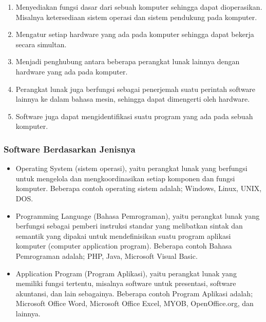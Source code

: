 \begin{enumerate}
\item Menyediakan fungsi dasar dari sebuah komputer sehingga dapat dioperasikan. Misalnya ketersediaan sistem operasi dan sistem pendukung pada komputer.

\item Mengatur setiap hardware yang ada pada komputer sehingga dapat bekerja secara simultan.

\item Menjadi penghubung antara beberapa perangkat lunak lainnya dengan hardware yang ada pada komputer.

\item Perangkat lunak juga berfungsi sebagai penerjemah suatu perintah software lainnya ke dalam bahasa mesin, sehingga dapat dimengerti oleh hardware.

\item Software juga dapat mengidentifikasi suatu program yang ada pada sebuah komputer.
\end{enumerate}

\subsubsection{Software Berdasarkan Jenisnya}

\begin{itemize}

\item Operating System (sistem operasi), yaitu perangkat lunak yang berfungsi untuk mengelola dan mengkoordinasikan setiap komponen dan fungsi komputer. Beberapa contoh operating sistem adalah; Windows, Linux, UNIX, DOS.

\item Programming Language (Bahasa Pemrograman), yaitu perangkat lunak yang berfungsi sebagai pemberi instruksi standar yang melibatkan sintak dan semantik yang dipakai untuk mendefinisikan suatu program aplikasi komputer (computer application program). Beberapa contoh Bahasa Pemrograman adalah; PHP, Java, Microsoft Visual Basic.

\item Application Program (Program Aplikasi), yaitu perangkat lunak yang memiliki fungsi tertentu, misalnya software untuk presentasi, software akuntansi, dan lain sebagainya. Beberapa contoh Program Aplikasi adalah; Microsoft Office Word, Microsoft Office Excel, MYOB, OpenOffice.org, dan lainnya.
\end{itemize}